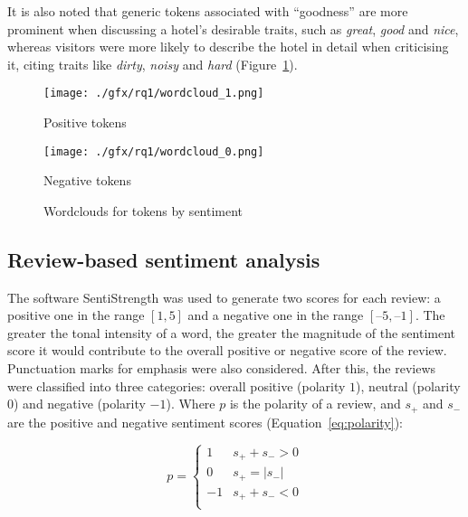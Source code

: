 \documentclass[12pt, a4paper]{pancake-article}
\begin{document}
It is also noted that generic tokens associated with ``goodness'' are more
prominent when discussing a hotel's desirable traits, such as \textit{great},
\textit{good} and \textit{nice}, whereas visitors were more likely to
describe the hotel in detail when criticising it, citing traits like
\textit{dirty}, \textit{noisy} and \textit{hard} (Figure~\ref{fig:wordclouds}).

\begin{figure}[htpb]
	\centering
	\begin{minipage}{0.5\textwidth}
		\centering
		\texttt{[image: ./gfx/rq1/wordcloud\_1.png]}
		\caption*{Positive tokens}
	\end{minipage}\hfill
	\begin{minipage}{0.5\textwidth}
		\centering
		\texttt{[image: ./gfx/rq1/wordcloud\_0.png]}
		\caption*{Negative tokens}
	\end{minipage}
	\caption{Wordclouds for tokens by sentiment}
	\label{fig:wordclouds}
\end{figure}

\subsection{Review-based sentiment analysis}\label{sec:reviews}

The software SentiStrength was used to generate two scores for each review:
a positive one in the range \(\left[1, 5\right]\) and a negative one in the range \(\left[–5, –1\right]\).
The greater the tonal intensity of a word, the greater the magnitude of the sentiment score
it would contribute to the overall positive or negative score of the review. Punctuation marks for
emphasis were also considered. After this, the reviews were classified into three categories: overall
positive (polarity \(1\)), neutral (polarity \(0\)) and negative (polarity \(-1\)). Where \(p\) is the polarity
of a review, and \(s_+\) and \(s_-\) are the positive and negative sentiment scores (Equation~\ref{eq:polarity}):

\begin{equation}
	p = \begin{cases}
		1  & s_+ + s_- > 0          \\
		0  & s_+ = \left|s_-\right| \\
		-1 & s_+ + s_- < 0          \\
	\end{cases}
	\label{eq:polarity}
\end{equation}
\end{document}
